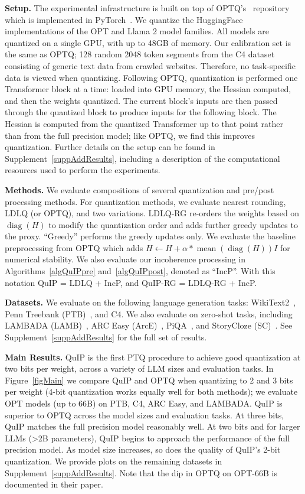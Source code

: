 \textbf{Setup.} 
The experimental infrastructure is built on top of OPTQ's~\citep{frantar2023gptq} repository which is implemented in PyTorch~\citep{paszke2019pytorch}. We quantize the HuggingFace implementations of the OPT and Llama 2 model families. All models are quantized on a single GPU, with up to 48GB of memory. Our calibration set is the same as OPTQ; 128 random 2048 token segments from the C4 dataset~\citep{raffel2020c4} consisting of generic text data from crawled websites. Therefore, no task-specific data is viewed when quantizing. Following OPTQ, quantization is performed one Transformer block at a time: loaded into GPU memory, the Hessian computed, and then the weights quantized. The current block's inputs are then passed through the quantized block to produce inputs for the following block. The Hessian is computed from the quantized Transformer up to that point rather than from the full precision model; like OPTQ, we find this improves quantization. Further details on the setup can be found in Supplement~\ref{suppAddResults}, including a description of the computational resources used to perform the experiments.

\textbf{Methods.}
We evaluate compositions of several quantization and pre/post processing methods. For quantization methods, we evaluate nearest rounding, LDLQ (or OPTQ), and two variations. LDLQ-RG re-orders the weights based on $\operatorname{diag}(H)$ to modify the quantization order and adds further greedy updates to the proxy. ``Greedy'' performs the greedy updates only. We evaluate the baseline preprocessing from OPTQ which adds $H \gets H +\alpha * \operatorname{mean}(\operatorname{diag}(H))I$
for numerical stability. We also evaluate our incoherence processing in Algorithms~\ref{algQuIPpre} and~\ref{algQuIPpost}, denoted as ``IncP''. With this notation QuIP = LDLQ + IncP, and QuIP-RG = LDLQ-RG + IncP.

\textbf{Datasets.}
We evaluate on the following language generation tasks: WikiText2~\citep{merity2016wiki}, Penn Treebank (PTB)~\citep{marcus1994penn}, and C4. We also evaluate on zero-shot tasks, including LAMBADA (LAMB)~\citep{paperno2016lambada}, ARC Easy (ArcE)~\citep{boratko2018arc}, PiQA~\citep{tat2003piqa}, and StoryCloze (SC)~\citep{2016storycloze}. See Supplement~\ref{suppAddResults} for the full set of results.

\textbf{Main Results.} QuIP is the first PTQ procedure to achieve good quantization at two bits per weight, across a variety of LLM sizes and evaluation tasks. In Figure~\ref{figMain} we compare QuIP and OPTQ when quantizing to 2 and 3 bits per weight (4-bit quantization works equally well for both methods); we evaluate OPT models (up to 66B) on PTB, C4, ARC Easy, and LAMBADA. QuIP is superior to OPTQ across the model sizes and evaluation tasks. At three bits, QuIP matches the full precision model reasonably well. At two bits and for larger LLMs (>2B parameters), QuIP begins to approach the performance of the full precision model. As model size increases, so does the quality of QuIP's 2-bit quantization. We provide plots on the remaining datasets in Supplement~\ref{suppAddResults}.
Note that the dip in OPTQ on OPT-66B is documented in their paper.

